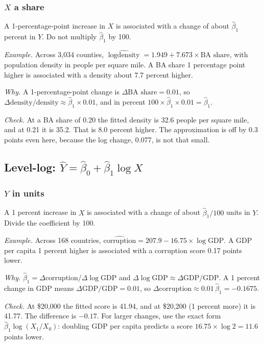 \documentclass[11pt]{article}
\begin{document}
\subsubsection*{$X$ a share}

A 1-percentage-point increase in $X$ is associated with a change of about $\hat\beta_1$ percent in
$Y$. Do not multiply $\hat\beta_1$ by 100.

\emph{Example.} Across 3,034 counties, $\widehat{\log \text{density}} = 1.949 + 7.673\times\text{BA share}$,
with population density in people per square mile. A BA share 1 percentage point higher is
associated with a density about 7.7 percent higher.

\emph{Why.} A 1-percentage-point change is $\Delta \text{BA share} = 0.01$, so
$\Delta\text{density}/\text{density} \approx \hat\beta_1\times 0.01$, and in percent
$100\times\hat\beta_1\times 0.01 = \hat\beta_1$.

\emph{Check.} At a BA share of 0.20 the fitted density is 32.6 people per square mile, and at 0.21 it is
35.2. That is 8.0 percent higher. The approximation is off by 0.3 points even here, because the
log change, 0.077, is not that small.

\subsection{\texorpdfstring{Level-log: $\hat{Y}=\hat{\beta}_0 + \hat{\beta}_1 \log X$}{Level-log}}

\subsubsection*{$Y$ in units}

A 1 percent increase in $X$ is associated with a change of about $\hat\beta_1/100$ units in $Y$.
Divide the coefficient by 100.

\emph{Example.} Across 168 countries, $\widehat{\text{corruption}} = 207.9 - 16.75\times\log\text{GDP}$.
A GDP per capita 1 percent higher is associated with a corruption score 0.17 points lower.

\emph{Why.} $\hat\beta_1 = \Delta\text{corruption}/\Delta\log\text{GDP}$ and
$\Delta\log\text{GDP}\approx\Delta\text{GDP}/\text{GDP}$. A 1 percent change in GDP means
$\Delta\text{GDP}/\text{GDP} = 0.01$, so $\Delta\text{corruption} \approx 0.01\,\hat\beta_1 = -0.1675$.

\emph{Check.} At \$20,000 the fitted score is 41.94, and at \$20,200 (1 percent more) it is 41.77. The
difference is $-0.17$. For larger changes, use the exact form $\hat\beta_1 \log(X_1/X_0)$: doubling
GDP per capita predicts a score $16.75\times\log 2 = 11.6$ points lower.
\end{document}
